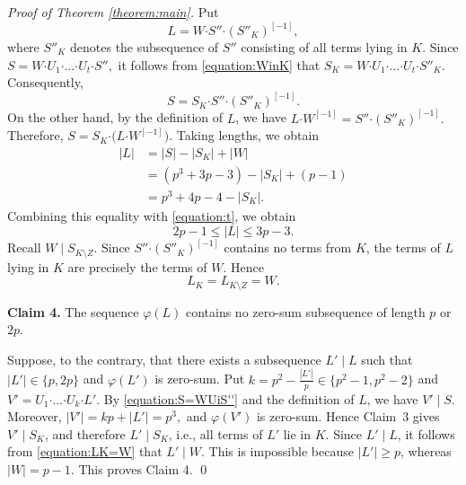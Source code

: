 \documentclass[a4paper, 12pt]{article}
\theoremstyle{definition}
\begin{document}
\begin{proof}[Proof of Theorem \ref{theorem:main}]
Put
$$L=W\boldsymbol{\cdot}S''
\boldsymbol{\cdot}(S''_K)^{[-1]},$$ where $S''_K$ denotes the
subsequence of $S''$ consisting of all terms lying in $K$.
Since
$S=
W\boldsymbol{\cdot}U_1\boldsymbol{\cdot}\ldots
\boldsymbol{\cdot}U_t\boldsymbol{\cdot}S'',$
it follows from \eqref{equation:WinK} that
$S_K=
W\boldsymbol{\cdot}U_1\boldsymbol{\cdot}\ldots
\boldsymbol{\cdot}U_t\boldsymbol{\cdot}S''_K.$
Consequently,
\begin{equation}\label{equation:S=SKtwo}
S=S_K\boldsymbol{\cdot}
S''\boldsymbol{\cdot}(S''_K)^{[-1]}.
\end{equation}
On the other hand, by the definition of $L$, we have
$L\boldsymbol{\cdot}W^{[-1]}
=
S''\boldsymbol{\cdot}(S''_K)^{[-1]}.$
Therefore,
$S=
S_K\boldsymbol{\cdot}
\bigl(L\boldsymbol{\cdot}W^{[-1]}\bigr).$
Taking lengths, we obtain
$$
\begin{aligned}
|L|
&=|S|-|S_K|+|W|\\
&=(p^3+3p-3)-|S_K|+(p-1)\\
&=p^3+4p-4-|S_K|.
\end{aligned}
$$
Combining this equality with \eqref{equation:t}, we obtain
\begin{equation}\label{equation:Lrange}
2p-1\leq |L|\leq3p-3.
\end{equation}
Recall $W\mid S_{K\setminus Z}$. Since
$S''\boldsymbol{\cdot}(S''_K)^{[-1]}$ contains no terms from $K$,
the terms of $L$ lying in $K$ are
precisely the terms of $W$. Hence
\begin{equation}\label{equation:LK=W}
L_K=L_{K\setminus Z}=W.
\end{equation}




\medskip
\noindent\textbf{Claim 4.} The sequence $\varphi(L)$ contains no zero-sum subsequence of length
$p$ or $2p$.

 \smallskip

Suppose, to the contrary, that there exists a
subsequence $L'\mid L$ such that
$|L'|\in\{p,2p\}$ and $\varphi(L')$ is zero-sum. Put
$k=p^2-\frac{|L'|}{p}\in\{p^2-1,p^2-2\}$
and
$V'=U_1\boldsymbol{\cdot}\ldots
\boldsymbol{\cdot}U_k\boldsymbol{\cdot}L'.$
By \eqref{equation:S=WUiS''} and the definition of $L$, we have
$V'\mid S$. Moreover,
$|V'|=kp+|L'|=p^3,$
and $\varphi(V')$ is zero-sum. Hence Claim~3 gives
$V'\mid S_K$, and therefore $L'\mid S_K$, i.e., all terms of $L'$ lie in
$K$.  Since $L'\mid L$, it follows from \eqref{equation:LK=W} that $L'\mid W$. This is impossible because
$|L'|\ge p$, whereas $|W|=p-1$. This proves Claim 4. \qed




\end{proof}
\end{document}
